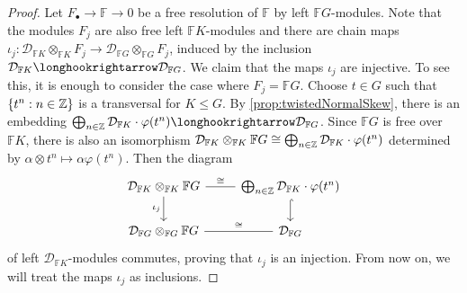 \documentclass[11pt, letterpaper]{amsart}
\begin{document}
\begin{proof}
Let $F_\bullet \longrightarrow \mathbb{F} \longrightarrow 0$ be a free resolution of $\mathbb{F}$ by left $\mathbb{F} G$-modules. Note that the modules $F_j$ are also free left $\mathbb{F}K$-modules and there are chain maps $\iota_j \colon \mathcal{D}_{\mathbb{F}K} \otimes_{\mathbb{F}K} F_j \longrightarrow \mathcal{D}_{\mathbb{F}G} \otimes_{\mathbb{F}G} F_j$, induced by the inclusion $\mathcal{D}_{\mathbb{F}K} \longhookrightarrow \mathcal{D}_{\mathbb{F}G}$. We claim that the maps $\iota_j$ are injective. To see this, it is enough to consider the case where $F_j = \mathbb{F}G$. Choose $t \in G$ such that $\{ t^n : n \in \mathbb{Z} \}$ is a transversal for $K \leqslant G$. By \cref{prop:twistedNormalSkew}, there is an embedding $\bigoplus_{n \in \Z} \mathcal{D}_{\mathbb{F}K} \cdot \varphi(t^n) \longhookrightarrow \mathcal{D}_{\mathbb{F}G}$. Since $\mathbb{F}G$ is free over $\mathbb{F}K$, there is also an isomorphism $\mathcal{D}_{\mathbb{F}K} \otimes_{\mathbb{F}K} \mathbb{F}G \cong \bigoplus_{n \in \mathbb{Z}} \mathcal{D}_{\mathbb{F}K} \cdot \varphi(t^n)$ determined by $\alpha \otimes t^n \longmapsto \alpha \varphi(t^n)$. Then the diagram
\[
\begin{tikzcd}
\mathcal{D}_{\mathbb{F}K} \otimes_{\mathbb{F}K} \mathbb{F}G \arrow[d, "\iota_j"'] \arrow[r, "\cong", no head] & {\bigoplus_{n \in \mathbb{Z}} \mathcal{D}_{\mathbb{F}K} \cdot \varphi(t^n)}  \arrow[d, hook] \\
\mathcal{D}_{\mathbb{F}G} \otimes_{\mathbb{F}G} \mathbb{F}G \arrow[r, "\cong", no head]                       &  \mathcal{D}_{\mathbb{F}G}
\end{tikzcd}
\]
of left $\mathcal{D}_{\mathbb{F}K}$-modules commutes, proving that $\iota_j$ is an injection. From now on, we will treat the maps $\iota_j$ as inclusions.


\end{proof}
\end{document}
